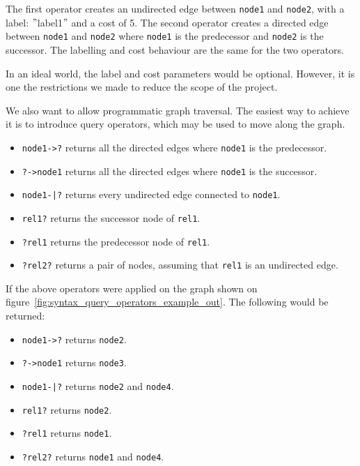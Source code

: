 The first operator creates an undirected edge between \lstinline{node1} and \lstinline{node2}, with a label: \("\)label1\("\) and a cost of 5.
The second operator creates a directed edge between \lstinline{node1} and \lstinline{node2} where \lstinline{node1}
is the predecessor and \lstinline{node2} is the successor.
The labelling and cost behaviour are the same for the two operators.

In an ideal world, the label and cost parameters would be optional.
However, it is one the restrictions we made to reduce the scope of the project.

We also want to allow programmatic graph traversal.
The easiest way to achieve it is to introduce query operators, which may be used to move along the graph.

\begin{itemize}
    \item \lstinline{node1->?} returns all the directed edges where \lstinline{node1} is the predecessor.
    \item \lstinline{?->node1} returns all the directed edges where \lstinline{node1} is the successor.
    \item \lstinline{node1-|?} returns every undirected edge connected to \lstinline{node1}.
    \item \lstinline{rel1?} returns the successor node of \lstinline{rel1}.
    \item \lstinline{?rel1} returns the predecessor node of \lstinline{rel1}.
    \item \lstinline{?rel2?} returns a pair of nodes, assuming that \lstinline{rel1} is an undirected edge.
\end{itemize}

If the above operators were applied on the graph shown on figure~\ref{fig:syntax_query_operators_example_out}.
The following would be returned:

\begin{itemize}
    \item \lstinline{node1->?} returns \lstinline{node2}.
    \item \lstinline{?->node1} returns \lstinline{node3}.
    \item \lstinline{node1-|?} returns \lstinline{node2} and \lstinline{node4}.
    \item \lstinline{rel1?} returns \lstinline{node2}.
    \item \lstinline{?rel1} returns \lstinline{node1}.
    \item \lstinline{?rel2?} returns \lstinline{node1} and \lstinline{node4}.
\end{itemize}

